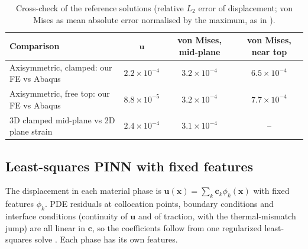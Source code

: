 \documentclass[11pt]{article}
\theoremstyle{remark}\newtheorem*{remark}{Remark}
\begin{document}
\begin{table}[t]
  \centering
  \caption{Cross-check of the reference solutions (relative $L_2$ error of displacement; von Mises as mean absolute
           error normalised by the maximum, as in \citet{zhu2025morestress}).}
  \label{tab:refcheck}
  \begin{tabular}{lccc}
    \toprule
    Comparison & $\bm u$ & von Mises, mid-plane & von Mises, near top \\
    \midrule
    Axisymmetric, clamped: our FE vs Abaqus & $2.2\times10^{-4}$ & $3.2\times10^{-4}$ & $6.5\times10^{-4}$ \\
    Axisymmetric, free top: our FE vs Abaqus & $8.8\times10^{-5}$ & $3.2\times10^{-4}$ & $7.7\times10^{-4}$ \\
    3D clamped mid-plane vs 2D plane strain & $2.4\times10^{-4}$ & $3.1\times10^{-4}$ & -- \\
    \bottomrule
  \end{tabular}
\end{table}

\subsection{Least-squares PINN with fixed features}
The displacement in each material phase is $\bm u(\bm x)=\sum_k \bm c_k\phi_k(\bm x)$ with fixed features $\phi_k$.
PDE residuals at collocation points, boundary conditions and interface conditions
(continuity of $\bm u$ and of traction, with the thermal-mismatch jump) are all linear in $\bm c$, so the
coefficients follow from one regularized least-squares solve \citep{dwivedi2020pielm}.
Each phase has its own features.
\end{document}
